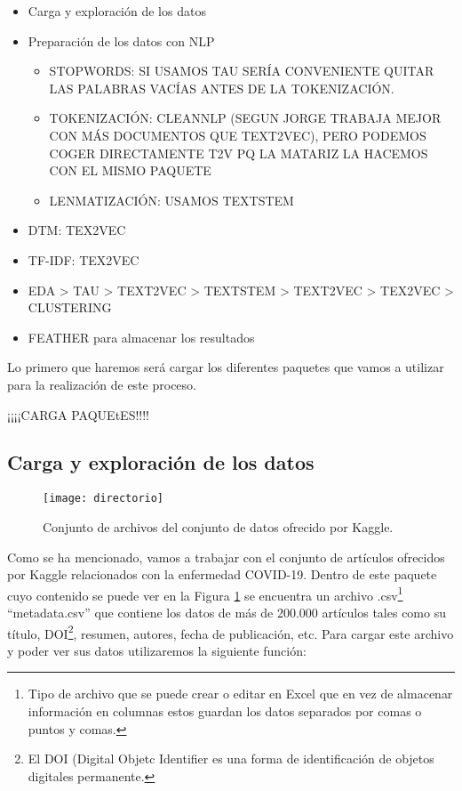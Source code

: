 \documentclass[10pt, a4paper]{article}
\begin{document}
\begin{itemize}
  \item Carga y exploración de los datos
  
  \item Preparación de los datos con NLP
  
  \begin{itemize}
  
    \item STOPWORDS: SI USAMOS TAU SERÍA CONVENIENTE QUITAR LAS PALABRAS VACÍAS ANTES DE LA TOKENIZACIÓN. 
  
    \item TOKENIZACIÓN: CLEANNLP (SEGUN JORGE TRABAJA MEJOR CON MÁS DOCUMENTOS QUE TEXT2VEC), PERO PODEMOS COGER DIRECTAMENTE T2V PQ LA MATARIZ LA HACEMOS CON EL MISMO PAQUETE
    
    \item LENMATIZACIÓN: USAMOS TEXTSTEM
  \end{itemize}
  
  \item DTM: TEX2VEC

  \item TF-IDF: TEX2VEC
  
  \item EDA > TAU > TEXT2VEC > TEXTSTEM > TEXT2VEC > TEX2VEC > CLUSTERING

  \item FEATHER para almacenar los resultados

\end{itemize}

Lo primero que haremos será cargar los diferentes paquetes que vamos a utilizar para la realización de este proceso.

¡¡¡¡CARGA PAQUEtES!!!!


\subsection{Carga y exploración de los datos}

\begin{figure}[ht]
\centering
\texttt{[image: directorio]}
\caption{Conjunto de archivos del conjunto de datos ofrecido por Kaggle.}
\label{fig:directorio}
\end{figure}

Como se ha mencionado, vamos a trabajar con el conjunto de artículos ofrecidos por Kaggle relacionados con la enfermedad COVID-19. Dentro de este paquete cuyo contenido se puede ver en la Figura \ref{fig:directorio} se encuentra un archivo .csv\footnote{Tipo de archivo que se puede crear o editar en Excel que en vez de almacenar información en columnas estos guardan los datos separados por comas o puntos y comas.} ``metadata.csv'' que contiene los datos de más de 200.000 artículos tales como su título, DOI\footnote{El DOI (Digital Objetc Identifier es una forma de identificación de objetos digitales permanente.}, resumen, autores, fecha de publicación, etc. Para cargar este archivo y poder ver sus datos utilizaremos la siguiente función:
\end{document}
